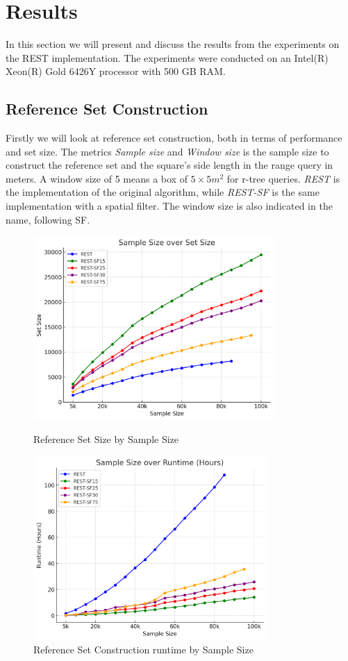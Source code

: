 \chapter{Results}
\label{chap:res}
In this section we will present and discuss the results from the experiments on the REST implementation. The experiments were conducted on an Intel(R) Xeon(R) Gold 6426Y processor with 500 GB RAM.

\section{Reference Set Construction}
Firstly we will look at reference set construction, both in terms of performance and set size. The metrics \textit{Sample size} and \textit{Window size} is the sample size to construct the reference set and the square's side length in the range query in meters. A window size of 5 means a box of $5\times5m^2$ for r-tree queries. \textit{REST} is the implementation of the original algorithm, while \textit{REST-SF} is the same implementation with a spatial filter. The window size is also indicated in the name, following SF.

\begin{figure}[ht]
    \begin{minipage}[b]{0.49\linewidth}
        \centering
        \includegraphics[width=\linewidth, height=7cm, keepaspectratio]{./figures/set_size.png}
        \caption{Reference Set Size by Sample Size}
        \label{fig:set_size}
    \end{minipage}
    \begin{minipage}[b]{0.49\linewidth}
        \centering
        \includegraphics[width=\linewidth, height=7cm, keepaspectratio]{./figures/set_runtime.png}
        \caption{Reference Set Construction runtime by Sample Size}
        \label{fig:set_runtime}
    \end{minipage}
\end{figure}

